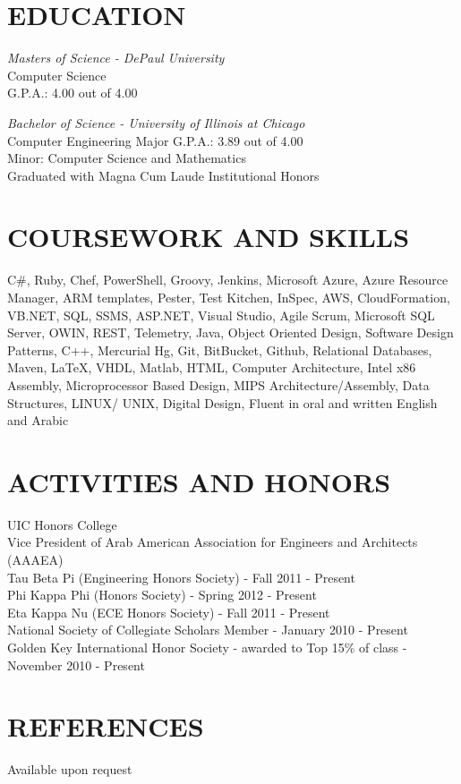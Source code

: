 \documentclass[margin]{res}
\begin{document}
\begin{resume}
\section{EDUCATION} 
{\sl Masters of Science - DePaul University} \\
	Computer Science\\
	G.P.A.: 4.00 out of 4.00

{\sl Bachelor of Science - University of Illinois at Chicago} \\
	Computer Engineering Major G.P.A.: 3.89 out of 4.00\\
	Minor: Computer Science and Mathematics \\
	Graduated with Magna Cum Laude Institutional Honors
                
\section{COURSEWORK AND SKILLS}  C\#, Ruby, Chef, PowerShell, Groovy, Jenkins, Microsoft Azure, Azure Resource Manager, ARM templates, Pester, Test Kitchen, InSpec, AWS, CloudFormation, VB.NET, SQL, SSMS, ASP.NET, Visual Studio, Agile Scrum, Microsoft SQL Server, OWIN, REST, Telemetry, Java, Object Oriented Design, Software Design Patterns, C++, Mercurial Hg, Git, BitBucket, Github, Relational Databases, Maven, LaTeX, VHDL, Matlab,  HTML, Computer Architecture, Intel x86 Assembly, Microprocessor Based Design, MIPS Architecture/Assembly, Data Structures, LINUX/ UNIX, Digital Design, Fluent in oral and written English and Arabic

\section{ACTIVITIES AND HONORS} 
	UIC Honors College\\
	Vice President of Arab American Association for Engineers and Architects (AAAEA) \\
	Tau Beta Pi (Engineering Honors Society) - Fall 2011 - Present \\
	Phi Kappa Phi (Honors Society) - Spring 2012 - Present \\
	Eta Kappa Nu (ECE Honors Society) - Fall 2011 - Present  \\          
	National Society of Collegiate Scholars Member - January 2010 - Present \\
	Golden Key International Honor Society - awarded to Top 15\% of class - November 2010 - Present 
                
\section{REFERENCES}  
	     Available upon request
\end{resume}
\end{document}
